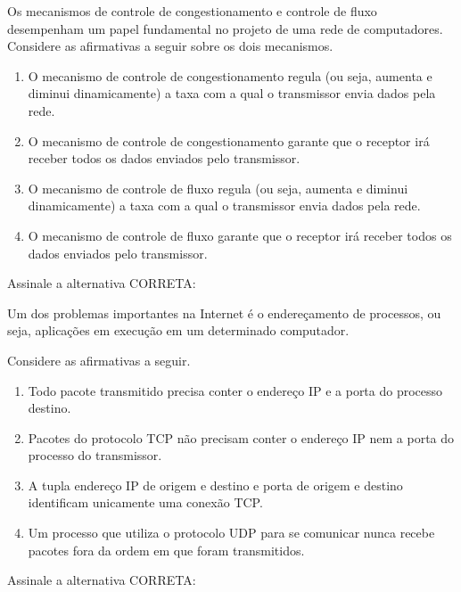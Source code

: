 \documentclass[10pt,a4paper]{article}
\begin{document}
%
{
\def\AMCbeginQuestion#1#2{\par\noindent{\bf (POSCOMP 2009 - Questão 62)}}
\begin{question}{} Os mecanismos de controle de congestionamento e controle de fluxo desempenham um papel fundamental no projeto de uma rede de computadores. Considere as afirmativas a seguir sobre os dois mecanismos.
\begin{enumerate}[label=\Roman*.]
\item O mecanismo de controle de congestionamento regula (ou seja, aumenta e diminui dinamicamente) a taxa com a qual o transmissor envia dados pela rede.
\item O mecanismo de controle de congestionamento garante que o receptor irá receber todos os dados enviados pelo transmissor.
\item O mecanismo de controle de fluxo regula (ou seja, aumenta e diminui dinamicamente) a taxa com a qual o transmissor envia dados pela rede.
\item O mecanismo de controle de fluxo garante que o receptor irá receber todos os dados enviados pelo transmissor.
\end{enumerate}
Assinale a alternativa CORRETA:
\begin{choices}
\end{choices}
\end{question}
}
%
{
\def\AMCbeginQuestion#1#2{\par\noindent{\bf (POSCOMP 2009 - Questão 63)}}
\begin{question}{} Um dos problemas importantes na Internet é o endereçamento de processos, ou seja, aplicações em execução em um determinado computador.

Considere as afirmativas a seguir.
\begin{enumerate}[label=\Roman*.]
\item Todo pacote transmitido precisa conter o endereço IP e a porta do processo destino.
\item Pacotes do protocolo TCP não precisam conter o endereço IP nem a porta do processo do transmissor.
\item A tupla endereço IP de origem e destino e porta de origem e destino identificam unicamente uma conexão TCP.
\item Um processo que utiliza o protocolo UDP para se comunicar nunca recebe pacotes fora da ordem em que foram transmitidos.
\end{enumerate}
Assinale a alternativa CORRETA:
\begin{choices}
\end{choices}
\end{question}
}
\end{document}
